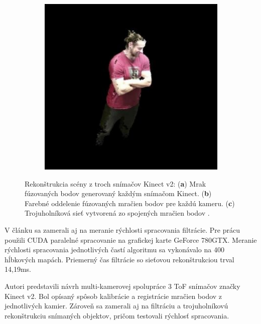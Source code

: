 \begin{figure}[H]
\begin{subfigure}[b]{0.315\textwidth}
		\caption{}
		\label{fig:resers:s}
	\end{subfigure}
	\hfill
	\begin{subfigure}[b]{0.32\textwidth}
		\centering
		\includegraphics[width=\textwidth]{figures/resers_t.png}
		\caption{}
		\label{fig:resers:t}
	\end{subfigure}
	\caption{Rekonštrukcia scény z troch snímačov Kinect v2:
		(\textbf{a}) Mrak fúzovaných bodov generovaný každým snímačom Kinect.
		(\textbf{b}) Farebné oddelenie fúzovaných mračien bodov pre každú kameru.
		(\textbf{c}) Trojuholníková sieť vytvorená zo spojených mračien bodov \cite{satnik2018multiview}.}
	\label{fig:resers:6}
\end{figure}

V článku sa zamerali aj na meranie rýchlosti spracovania filtrácie. Pre prácu použili CUDA paralelné spracovanie na grafickej karte GeForce 780GTX. 
Meranie rýchlosti spracovania jednotlivých častí algoritmu sa vykonávalo na 400 hĺbkových mapách. Priemerný čas filtrácie so sieťovou rekonštrukciou trval 14,19ms. 

Autori predstavili návrh multi-kamerovej spolupráce 3 ToF snímačov značky Kinect v2. Bol opísaný spôsob kalibrácie a registrácie mračien bodov z jednotlivých kamier. Zároveň sa zamerali aj na filtráciu a trojuholníkovú rekonštrukciu snímaných objektov, pričom testovali rýchlosť spracovania.

